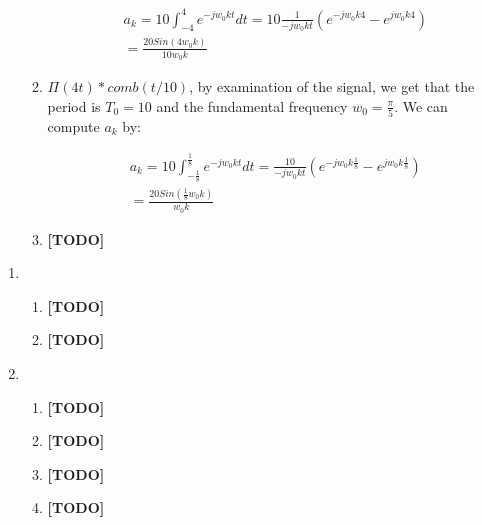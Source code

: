 \documentclass[]{article}
\begin{document}
\begin{enumerate}
\begin{enumerate}
    \[\begin{aligned}
        a_k = 
            10\int_{-4}^{4} e^{-jw_0 k t} dt = 
            10 \frac{1}{-jw_0kt} \left(  e^{-jw_0k4}- e^{jw_0k4}\right) \\
        = \boxed{ \frac{20Sin(4w_0 k)}{10 w_0 k} } 
    \end{aligned}\]
  \item
    \(\Pi(4t) * comb(t / 10)\), by examination of the signal, we get
    that the period is \(T_0 = 10\) and the fundamental frequency
    \(\boxed{w_0 = \frac{\pi}{5}}\). We can compute \(a_k\) by:

    \[\begin{aligned}
        a_k = 
            10 \int_{-\frac{1}{8}}^{\frac{1}{8}} e^{-jw_0 k t} dt  = 
            \frac{10}{-jw_0kt } \left( 
                e^{-jw_0k\frac{1}{8}}- e^{jw_0k\frac{1}{8}}
            \right) \\
        = \boxed{ \frac{20Sin(\frac{1}{8}w_0 k)}{w_0 k} }
    \end{aligned}\]
  \item
    \textbf{{[}TODO{]}}
  \end{enumerate}
\end{enumerate}

\begin{enumerate}
\def\labelenumi{\arabic{enumi}.}
\setcounter{enumi}{4}
\item
  \begin{enumerate}
  \def\labelenumii{\alph{enumii}.}
  \item
    \textbf{{[}TODO{]}}
  \item
    \textbf{{[}TODO{]}}
  \end{enumerate}
\item
  \begin{enumerate}
  \def\labelenumii{\alph{enumii}.}
  \item
    \textbf{{[}TODO{]}}
  \item
    \textbf{{[}TODO{]}}
  \item
    \textbf{{[}TODO{]}}
  \item
    \textbf{{[}TODO{]}}
  \end{enumerate}
\end{enumerate}
\end{document}
